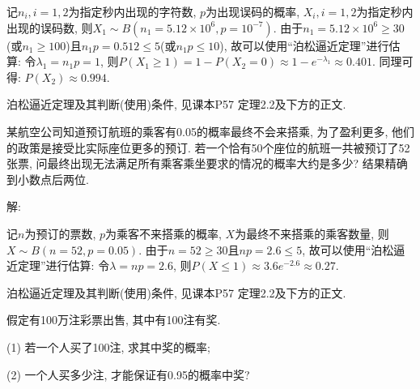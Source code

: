\documentclass[standard]{ExBook}
\begin{document}
\begin{qitems}
\begin{bbox}
记$n_{i},i=1,2$为指定秒内出现的字符数, $p$为出现误码的概率, $X_{i},i=1,2$为指定秒内出现的误码数, 则$X_{1}\sim B(n_{1}=5.12\times10^{6},p=10^{-7})$. 由于$n_{1}=5.12\times10^{6}\geq30$(或$n_{1}\geq100$)且$n_{1}p=0.512 \leq 5$(或$n_{1}p \leq 10$), 故可以使用``泊松逼近定理''进行估算: 令$\lambda_{1}=n_{1}p=1$, 则$P(X_{1} \geq 1)=1-P(X_{2}=0)\approx1-e^{-\lambda_{1}}\approx0.401$. 同理可得: $P(X_{2})\approx0.994$.

\textcolor{themeColor}{\selectfont {} 泊松逼近定理及其判断(使用)条件, 见课本P57 定理2.2及下方的正文.}
    \end{bbox}

\vspace{-5em}

    \begin{bbox}
    \begin{shaded}
        \qitem
某航空公司知道预订航班的乘客有0.05的概率最终不会来搭乘, 为了盈利更多, 他们的政策是接受比实际座位更多的预订. 若一个恰有50个座位的航班一共被预订了52张票, 问最终出现无法满足所有乘客乘坐要求的情况的概率大约是多少? 结果精确到小数点后两位.
    \end{shaded}
    \end{bbox}

\vspace{-5em}

    \begin{bbox}
解: 

记$n$为预订的票数, $p$为乘客不来搭乘的概率, $X$为最终不来搭乘的乘客数量, 则$X\sim B(n=52,p=0.05)$. 由于$n=52\geq30$且$np=2.6 \leq 5$, 故可以使用``泊松逼近定理''进行估算: 令$\lambda=np=2.6$, 则$P(X \leq 1)\approx3.6e^{-2.6}\approx0.27$.

\textcolor{themeColor}{\selectfont {} 泊松逼近定理及其判断(使用)条件, 见课本P57 定理2.2及下方的正文.}
    \end{bbox}

\vspace{-5em}

    \begin{bbox}
    \begin{shaded}
        \qitem
假定有100万注彩票出售, 其中有100注有奖.

(1) 若一个人买了100注, 求其中奖的概率;

(2) 一个人买多少注, 才能保证有0.95的概率中奖?
    \end{shaded}
    \end{bbox}

\vspace{-5em}


\end{qitems}
\end{document}
